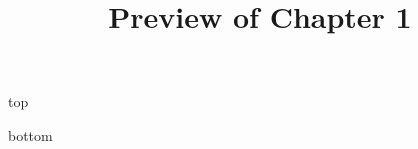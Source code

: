 \documentclass{ximera}
\title{Preview of Chapter 1}
\begin{document}
\begin{abstract}
\end{abstract}

\maketitle
top

\begin{expandable}

\end{expandable}






bottom
\end{document}
